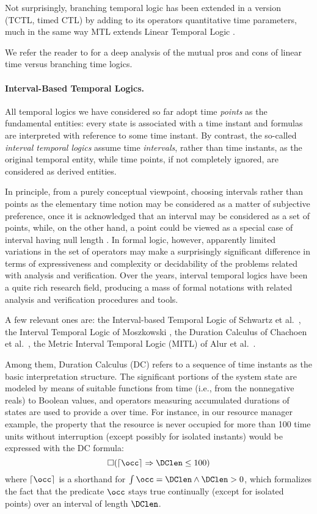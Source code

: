 Not surprisingly, branching temporal logic has been extended 
in a  version (TCTL, timed CTL) by adding to its operators 
quantitative time parameters, much in the same way MTL extends 
Linear Temporal Logic \cite{ACD93,HNSY94}. 

We refer the reader to \cite{Var01} for a deep analysis of the mutual 
pros and cons of linear time versus branching time logics.


\paragraph{Interval-Based Temporal Logics.}
All temporal logics we have considered so far adopt time \emph{points} 
as the fundamental entities: every state is associated with a 
time instant and formulas are interpreted with reference to some 
time instant. By contrast, the so-called \emph{interval temporal 
logics} assume time \emph{intervals}, rather than time instants, 
as the original temporal entity, while time points, if not completely 
ignored, are considered as derived entities. 

In principle, from a purely conceptual viewpoint, choosing intervals 
rather than points as the elementary time notion may be considered 
as a matter of subjective preference, once it is acknowledged 
that an interval may be considered as a set of points, while, 
on the other hand, a point could be viewed as a special case 
of interval having null length \cite{Koy92}. In formal logic, however, 
apparently limited variations in the set of operators may make 
a surprisingly significant difference in terms of expressiveness 
and complexity or decidability of the problems related with analysis 
and verification. Over the years, interval temporal logics have 
been a quite rich research field, producing a mass of formal 
notations with related analysis and verification procedures and 
tools.

A few relevant ones are: the Interval-based Temporal Logic of 
Schwartz et al.~\cite{SMV83}, the Interval Temporal Logic of Moszkowski \cite{Mos83,Mos86},
the Duration Calculus of Chachoen et al.~\cite{CHR91}, the Metric Interval Temporal Logic (MITL)
of Alur et al.~\cite{AFH96}. 

Among them, Duration Calculus (DC) refers to a  sequence of
time instants as the basic interpretation structure. The significant
portions of the system state are modeled by means of suitable
functions from time (i.e., from the nonnegative reals) to Boolean
values, and operators measuring accumulated durations of states are
used to provide a  over time. For instance, in our resource
manager example, the property that the resource is never occupied for
more than 100 time units without interruption (except possibly for
isolated instants) would be expressed with the DC formula:
\begin{equation*}
  \Box ( \lceil \occ \rceil \Rightarrow \DClen \leq 100 )
\end{equation*}
where $\lceil \occ \rceil$ is a shorthand for $\int \occ = \DClen \wedge \DClen > 0$, which formalizes the 
fact that the predicate $\occ$ stays true continually (except for isolated points) over an interval of length $\DClen$.

